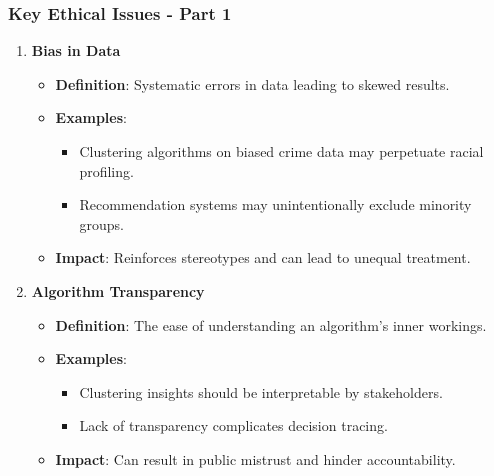 \documentclass[aspectratio=169]{beamer}
\begin{document}
\begin{frame}[fragile]
    \frametitle{Key Ethical Issues - Part 1}
    \begin{enumerate}
        \item \textbf{Bias in Data}
        \begin{itemize}
            \item \textbf{Definition}: Systematic errors in data leading to skewed results.
            \item \textbf{Examples}:
                \begin{itemize}
                    \item Clustering algorithms on biased crime data may perpetuate racial profiling.
                    \item Recommendation systems may unintentionally exclude minority groups.
                \end{itemize}
            \item \textbf{Impact}: Reinforces stereotypes and can lead to unequal treatment.
        \end{itemize}
        
        \item \textbf{Algorithm Transparency}
        \begin{itemize}
            \item \textbf{Definition}: The ease of understanding an algorithm's inner workings.
            \item \textbf{Examples}:
                \begin{itemize}
                    \item Clustering insights should be interpretable by stakeholders.
                    \item Lack of transparency complicates decision tracing.
                \end{itemize}
            \item \textbf{Impact}: Can result in public mistrust and hinder accountability.
        \end{itemize}
    \end{enumerate}
\end{frame}
\end{document}
